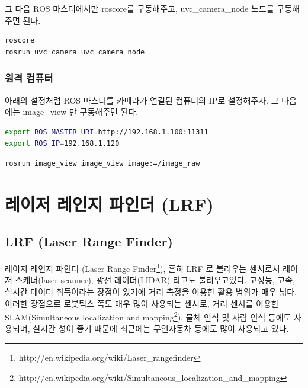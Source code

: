 \noindent
그 다음 ROS 마스터에서만 roscore를 구동해주고, uvc\_camera\_node 노드를 구동해 주면 된다.

\begin{lstlisting}[language=ROS]
roscore
rosrun uvc_camera uvc_camera_node
\end{lstlisting}

\subsubsection{원격 컴퓨터}

아래의 설정처럼 ROS 마스터를 카메라가 연결된 컴퓨터의 IP로 설정해주자. 그 다음에는 image\_view 만 구동해주면 된다.

\begin{lstlisting}[language=bash]
export ROS_MASTER_URI=http://192.168.1.100:11311 
export ROS_IP=192.168.1.120
\end{lstlisting}

\begin{lstlisting}[language=ROS]
rosrun image_view image_view image:=/image_raw
\end{lstlisting}

\section{레이저 레인지 파인더 (LRF)}

\subsection{LRF (Laser Range Finder)}

레이저 레인지 파인더 (Laser Range Finder\footnote{http://en.wikipedia.org/wiki/Laser\_rangefinder}), 흔히 LRF 로 불리우는 센서로서 레이저 스캐너(laser scanner), 광선 레이더(LIDAR) 라고도 불리우고있다. 고성능, 고속, 실시간 데이터 취득이라는 장점이 있기에 거리 측정을 이용한 활용 범위가 매우 넓다. 이러한 장점으로 로봇틱스 쪽도 매우 많이 사용되는 센서로, 거리 센서를 이용한 SLAM(Simultaneous localization and mapping\footnote{http://en.wikipedia.org/wiki/Simultaneous\_localization\_and\_mapping}), 물체 인식 및 사람 인식 등에도 사용되며, 실시간 성이 좋기 때문에 최근에는 무인자동차 등에도 많이 사용되고 있다. 


